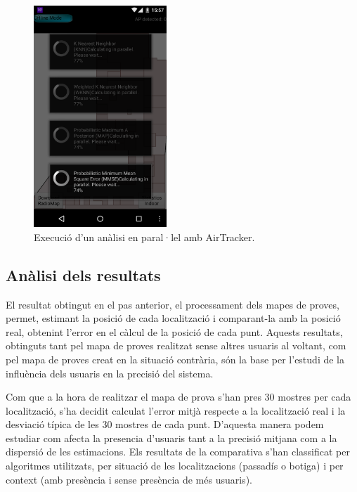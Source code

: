 \begin{figure}[ht]
\begin{center}
\includegraphics[width=5cm]{imatges/analisi_offline_paralel.png}
\caption{Execució d'un anàlisi en paral·lel amb AirTracker.}
\label{fig:analisi_offline_paralel}
\end{center}
\end{figure}

\subsection{Anàlisi dels resultats}

El resultat obtingut en el pas anterior, el processament dels mapes de proves, permet, estimant la posició de cada localització i comparant-la amb la posició real, obtenint l'error en el càlcul de la posició de cada punt. Aquests resultats, obtinguts tant pel mapa de proves realitzat sense altres usuaris al voltant, com pel mapa de proves creat en la situació contrària, són la base per l'estudi de la influència dels usuaris en la precisió del sistema.

Com que a la hora de realitzar el mapa de prova s'han pres 30 mostres per cada localització, s'ha decidit calculat l'error mitjà respecte a la localització real i la desviació típica de les 30 mostres de cada punt. D'aquesta manera podem estudiar com afecta la presencia d'usuaris tant a la precisió mitjana com a la dispersió de les estimacions. Els resultats de la comparativa s'han classificat per algoritmes utilitzats, per situació de les localitzacions (passadís o botiga) i per context (amb presència i sense presència de més usuaris).


